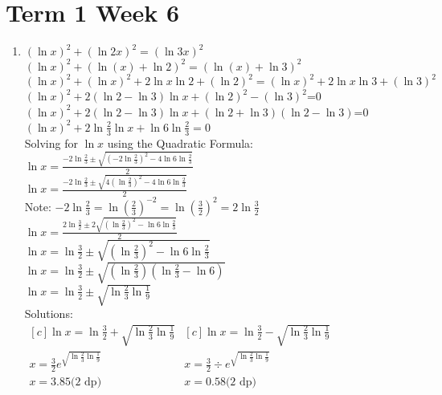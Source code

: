 \documentclass[../main.tex]{subfiles}
\begin{document}
\section*{Term 1 Week 6}
\begin{enumerate}
    \item 
    \((\ln{x})^2+(\ln{2x})^2=(\ln{3x})^2\)\\
    \((\ln{x})^2+(\ln{(x)}+\ln{2})^2=(\ln{(x)}+\ln{3})^2\)\\
    \((\ln{x})^2+(\ln{x})^2+2\ln{x}\ln{2}+(\ln{2})^2=(\ln{x})^2+2\ln{x}\ln{3}+(\ln{3})^2\)\\
    \((\ln{x})^2+2(\ln{2}-\ln{3})\ln{x}+(\ln{2})^2-(\ln{3})^2\)=0\\
    \((\ln{x})^2+2(\ln{2}-\ln{3})\ln{x}+(\ln{2}+\ln{3})(\ln{2}-\ln{3})\)=0\\
    \((\ln{x})^2+2\ln{\frac{2}{3}}\ln{x}+\ln{6}\ln{\frac{2}{3}}=0\)\\

    Solving for \(\ln{x}\) using the Quadratic Formula:\\
    \(\ln{x}=\frac{-2\ln{\frac{2}{3}}\pm \sqrt{(-2\ln{\frac{2}{3}})^2-4\ln{6}\ln{\frac{2}{3}}}}{2}\)\\

    \(\ln{x}=\frac{-2\ln{\frac{2}{3}}\pm \sqrt{4(\ln{\frac{2}{3}})^2-4\ln{6}\ln{\frac{2}{3}}}}{2}\)\\

    Note: \(-2\ln{\frac{2}{3}}=\ln{(\frac{2}{3})^{-2}}=\ln{(\frac{3}{2})^2=2\ln{\frac{3}{2}}}\)\\

    \(\ln{x}=\frac{2\ln{\frac{3}{2}}\pm 2\sqrt{(\ln{\frac{2}{3}})^2-\ln{6}\ln{\frac{2}{3}}}}{2}\)\\

    \(\ln{x}=\ln{\frac{3}{2}}\pm \sqrt{(\ln{\frac{2}{3}})^2-\ln{6}\ln{\frac{2}{3}}}\)\\

    \(\ln{x}=\ln{\frac{3}{2}}\pm \sqrt{(\ln{\frac{2}{3}})(\ln{\frac{2}{3}}-\ln{6})}\)\\

    \(\ln{x}=\ln{\frac{3}{2}}\pm \sqrt{\ln{\frac{2}{3}}\ln{\frac{1}{9}}}\)\\

    Solutions:\\
    $
    \begin{aligned}[c]
    \ln{x}=\ln{\frac{3}{2}}+ \sqrt{\ln{\frac{2}{3}}\ln{\frac{1}{9}}}\\
    x=\frac{3}{2}e^{\sqrt{\ln{\frac{2}{3}}\ln{\frac{1}{9}}}}\\
    x=3.85 \text{(2 dp)}\\
    \end{aligned}
    \begin{aligned}[c]
    \ln{x}=\ln{\frac{3}{2}}- \sqrt{\ln{\frac{2}{3}}\ln{\frac{1}{9}}}\\
    x=\frac{3}{2}\div e^{\sqrt{\ln{\frac{2}{3}}\ln{\frac{1}{9}}}}\\
    x=0.58 \text{(2 dp)}\\
    \end{aligned}
    $
    

\end{enumerate}
\end{document}
